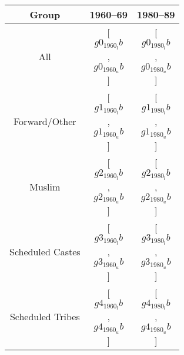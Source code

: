 \begin{tabular}{ccc} 
\hline
\hline
Group & 1960--69 & 1980--89 \\
\hline 
All & [$$g0_1960_lb$$, $$g0_1960_ub$$] &
[$$g0_1980_lb$$, $$g0_1980_ub$$] \\
Forward/Other & [$$g1_1960_lb$$, $$g1_1960_ub$$] &
[$$g1_1980_lb$$, $$g1_1980_ub$$] \\
Muslim & [$$g2_1960_lb$$, $$g2_1960_ub$$] & [$$g2_1980_lb$$, $$g2_1980_ub$$] \\
Scheduled Castes & [$$g3_1960_lb$$, $$g3_1960_ub$$] & [$$g3_1980_lb$$, $$g3_1980_ub$$] \\
Scheduled Tribes & [$$g4_1960_lb$$, $$g4_1960_ub$$] & [$$g4_1980_lb$$, $$g4_1980_ub$$] \\
\hline
\hline 
\end{tabular}
